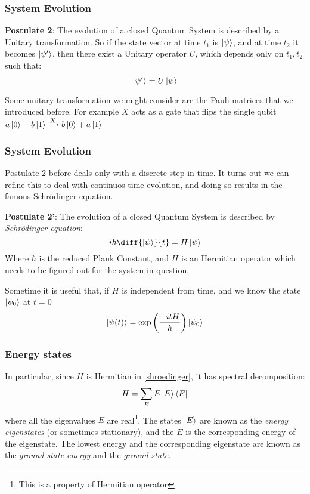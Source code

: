 \documentclass{beamer}
\begin{document}
    \begin{frame}
        \frametitle{System Evolution}
        \begin{definition}
            \textbf{Postulate 2}: The evolution of a closed Quantum System is described by a
            Unitary transformation. So if the state vector at time $t_1$ is $\ket{\psi}$, 
            and at time $t_2$ it becomes $\ket{\psi'}$, then there exist a Unitary operator $U$, 
            which depends only on $t_1, t_2$ such that:
            \begin{equation}
                \ket{\psi'} = U \ket{\psi}
            \end{equation}

        \end{definition}
        Some unitary transformation we might consider are the Pauli matrices that we introduced before.
        For example $X$ acts as a gate that flips the single qubit $a\ket{0} + b\ket{1} \xrightarrow{X} b\ket{0} + a\ket{1}$
    \end{frame}
    \begin{frame}
        \frametitle{System Evolution}
        Postulate 2 before deals only with a discrete step in time. It turns out we can refine this to deal
        with continuos time evolution, and doing so results in the famous Schrödinger equation.
        \begin{definition}
            \textbf{Postulate 2'}:  The evolution of a closed Quantum System is described by \textit{Schrödinger equation}:
            \begin{equation}
                \label{shroedinger}
                i \hbar \diff{\ket{\psi}}{t} = H \ket{\psi}
            \end{equation}
            Where $\hbar$ is the reduced Plank Constant, and $H$ is an Hermitian operator which needs to 
            be figured out for the system in question.
        \end{definition}
        Sometime it is useful that, if $H$ is independent from time, and we know the state $\ket{\psi_0}$ at $t = 0$
        \begin{equation}
            \ket{\psi(t)} = \exp\left(\frac{-itH}{\hbar}\right)\ket{\psi_0}
        \end{equation}
    \end{frame}
    \begin{frame}
        \frametitle{Energy states}
        In particular, since $H$ is Hermitian in \ref{shroedinger}, it has spectral decomposition:
        \begin{equation}
            H = \sum_E E \ket{E}\bra{E}
        \end{equation}
        where all the eigenvalues $E$ are real\footnote{This is a property of Hermitian operator}. 
        The states $\ket{E}$ are known as the \textit{energy eigenstates} (or sometimes stationary), and the $E$ is the corresponding
        energy of the eigenstate. The lowest energy and the corresponding eigenstate are known as the \textit{ground state energy} and the \textit{ground state}.
    \end{frame}
\end{document}
